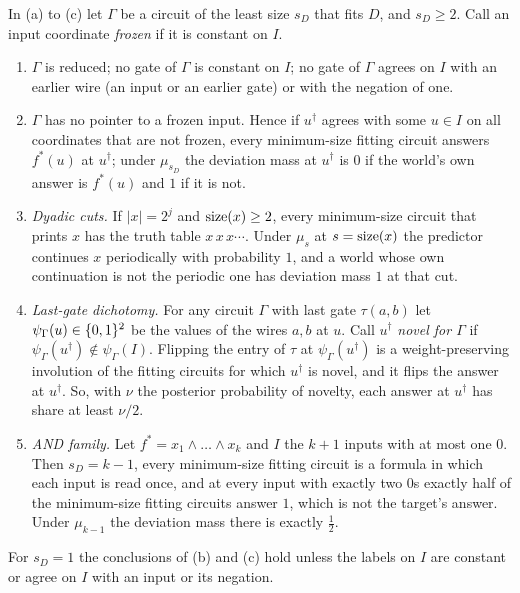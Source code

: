 \begin{theorem}\label{thm:c-minimum}
In (a) to (c) let $\Gamma$ be a circuit of the least size $s_D$ that fits $D$, and $s_D\ge2$. Call an input
coordinate \emph{frozen} if it is constant on $I$.
\begin{enumerate}[label=(\alph*),leftmargin=2em,itemsep=2pt,topsep=2pt]
\item $\Gamma$ is reduced; no gate of $\Gamma$ is constant on $I$; no gate of $\Gamma$ agrees on $I$ with an
earlier wire (an input or an earlier gate) or with the negation of one.
\item $\Gamma$ has no pointer to a frozen input. Hence if $u^\dagger$ agrees with some $u\in I$ on all
coordinates that are not frozen, every minimum-size fitting circuit answers $f^*(u)$ at $u^\dagger$; under
$\mu_{s_D}$ the deviation mass at $u^\dagger$ is $0$ if the world's own answer is $f^*(u)$ and $1$ if it is
not.
\item \emph{Dyadic cuts.} If $|x|=2^j$ and $\mathrm{size}(x)\ge2$, every minimum-size circuit that prints $x$ has the
truth table $x\,x\,x\cdots$. Under $\mu_s$ at $s=\mathrm{size}(x)$ the predictor continues $x$ periodically with
probability $1$, and a world whose own continuation is not the periodic one has deviation mass $1$ at that
cut.
\item \emph{Last-gate dichotomy.} For any circuit $\Gamma$ with last gate $\tau(a,b)$ let
$\psi_\Gamma(u)\in\{0,1\}^2$ be the values of the wires $a,b$ at $u$. Call $u^\dagger$ \emph{novel for $\Gamma$} if
$\psi_\Gamma(u^\dagger)\notin\psi_\Gamma(I)$. Flipping the entry of $\tau$ at $\psi_\Gamma(u^\dagger)$ is a
weight-preserving involution of the fitting circuits for which $u^\dagger$ is novel, and it flips the answer
at $u^\dagger$. So, with $\nu$ the posterior probability of novelty, each answer at $u^\dagger$ has share at
least $\nu/2$.
\item \emph{AND family.} Let $f^*=x_1\wedge\dots\wedge x_k$ and $I$ the $k+1$ inputs with at most one $0$.
Then $s_D=k-1$, every minimum-size fitting circuit is a formula in which each input is read once, and at every
input with exactly two $0$s exactly half of the minimum-size fitting circuits answer $1$, which is not the
target's answer. Under $\mu_{k-1}$ the deviation mass there is exactly $\frac12$.
\end{enumerate}
For $s_D=1$ the conclusions of (b) and (c) hold unless the labels on $I$ are constant or agree on $I$ with an
input or its negation.
\end{theorem}

